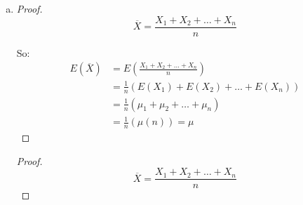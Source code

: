 \documentclass[11pt]{extarticle}
\begin{document}
\begin{enumerate}[(a)]
\begin{proof}
Dividing by $(x-\mu)^2$: \begin{equation*} \begin{split} 
P(|X - \mu| \geq \epsilon )   \leq \ &\frac{\sigma^2}{(x-\mu)^2}   \\
 P(|X - \mu| \leq \epsilon )   \geq \  & 1 - \frac{\sigma^2}{(x-\mu)^2}  \\
\end{split} 
\end{equation*}

Since $x-\mu = \epsilon$ (???): $$  \boxed{ P(|X - \mu| \leq \epsilon )   \leq 1-  \frac{\sigma^2}{\epsilon^2} } $$



\end{proof}

\item \begin{proof} $$ \overline{X} = \frac{X_1 + X_2 + \dots + X_n}{n} $$

So: \begin{align*}E( \overline{X} ) & = E \left( \frac{X_1 + X_2 + \dots + X_n}{n} \right) \\
& = \frac{1}{n} \left( E(X_1) + E(X_2) + \dots + E(X_n) \right) \\
& = \frac{1}{n} \left( \mu_1 + \mu_2 + \dots + \mu_n \right) \\
& = \frac{1}{n} \left( \mu(n) \right) = \boxed{\mu}  
\end{align*} \end{proof}

\begin{proof} $$ \overline{X} = \frac{X_1 + X_2 + \dots + X_n}{n} $$


\end{proof}
\end{enumerate}
\end{document}
